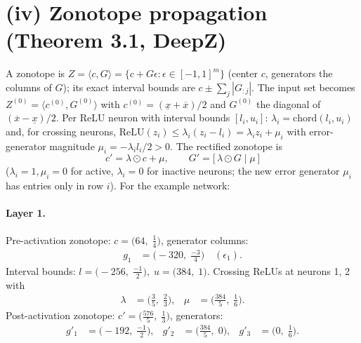 \documentclass[11pt]{article}
\begin{document}
\section{(iv) Zonotope propagation (Theorem 3.1, DeepZ)}
A zonotope is $Z = \langle c, G \rangle = \{c + G\epsilon : \epsilon \in [-1,1]^m\}$
(center $c$, generators the columns of $G$); its exact interval bounds are
$c \pm \sum_j |G_{:j}|$. The input set becomes $Z^{(0)} = \langle c^{(0)}, G^{(0)} \rangle$ with
$c^{(0)} = (\underline{x} + \overline{x})/2$ and $G^{(0)}$ the diagonal of $(\overline{x} - \underline{x})/2$.
Per ReLU neuron with interval bounds $[l_i, u_i]$:
$\lambda_i = \mathrm{chord}(l_i, u_i)$ and, for crossing neurons,
$\mathrm{ReLU}(z_i) \le \lambda_i (z_i - l_i) = \lambda_i z_i + \mu_i$ with error-generator magnitude
$\mu_i = -\lambda_i l_i / 2 > 0$. The rectified zonotope is
\begin{equation*}
c' = \lambda \odot c + \mu, \qquad G' = \bigl[\, \lambda \odot G \;\big|\; \mu\, \bigr]
\end{equation*}
($\lambda_i = 1, \mu_i = 0$ for active, $\lambda_i = 0$ for inactive neurons;
the new error generator $\mu_i$ has entries only in row $i$).
For the example network:
\paragraph{Layer 1.}
Pre-activation zonotope: $c = \bigl(64,\; \frac{1}{4}\bigr)$, generator columns:
\begin{align*}
g_{1} &= \bigl(-320,\; \frac{-3}{4}\bigr) \quad (\epsilon_{1}).
\end{align*}
Interval bounds: $l = \bigl(-256,\; \frac{-1}{2}\bigr), \; u = \bigl(384,\; 1\bigr)$. 
Crossing ReLUs at neurons 1, 2 with
\begin{align*}
\lambda &= \bigl(\frac{3}{5},\; \frac{2}{3}\bigr), & \mu &= \bigl(\frac{384}{5},\; \frac{1}{6}\bigr).
\end{align*}
Post-activation zonotope: $c' = \bigl(\frac{576}{5},\; \frac{1}{3}\bigr)$, generators:
\begin{align*}
g'_{1} &= \bigl(-192,\; \frac{-1}{2}\bigr), &
g'_{2} &= \bigl(\frac{384}{5},\; 0\bigr), &
g'_{3} &= \bigl(0,\; \frac{1}{6}\bigr).
\end{align*}
\end{document}
